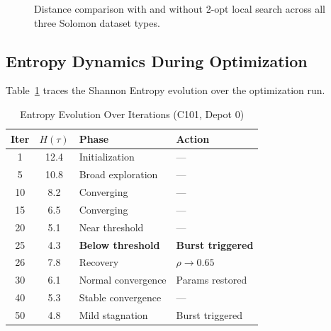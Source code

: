 \documentclass[10pt,conference]{IEEEtran}
\begin{document}
\begin{figure}[h]
\centering
{}
\caption{Distance comparison with and without 2-opt local search across all three Solomon dataset types.}
\label{fig:2opt_bar}
\end{figure}

\subsection{Entropy Dynamics During Optimization}

Table~\ref{tab:entropy_dynamics} traces the Shannon Entropy evolution over the optimization run.

\begin{table}[h]
\caption{Entropy Evolution Over Iterations (C101, Depot 0)}
\label{tab:entropy_dynamics}
\begin{center}
\footnotesize
\begin{tabular}{|c|c|l|l|}
\hline
\textbf{Iter} & $H(\tau)$ & \textbf{Phase} & \textbf{Action} \\
\hline
1 & 12.4 & Initialization & --- \\
5 & 10.8 & Broad exploration & --- \\
10 & 8.2 & Converging & --- \\
15 & 6.5 & Converging & --- \\
20 & 5.1 & Near threshold & --- \\
25 & 4.3 & \textbf{Below threshold} & \textbf{Burst triggered} \\
26 & 7.8 & Recovery & $\rho \rightarrow 0.65$ \\
30 & 6.1 & Normal convergence & Params restored \\
40 & 5.3 & Stable convergence & --- \\
50 & 4.8 & Mild stagnation & Burst triggered \\
\hline
\end{tabular}
\end{center}
\end{table}
\end{document}
